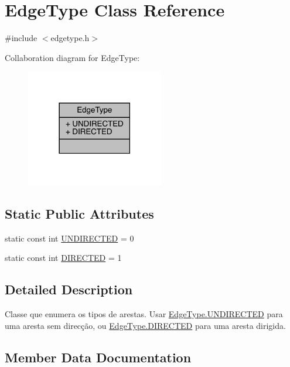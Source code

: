 \hypertarget{class_edge_type}{}\section{Edge\+Type Class Reference}
\label{class_edge_type}


{\ttfamily \#include $<$edgetype.\+h$>$}



Collaboration diagram for Edge\+Type\+:\nopagebreak
\begin{figure}[H]
\begin{center}
\leavevmode
\includegraphics[width=170pt]{class_edge_type__coll__graph}
\end{center}
\end{figure}
\subsection*{Static Public Attributes}
\begin{DoxyCompactItemize}
\item 
static const int \hyperlink{class_edge_type_a6533cc56d05c288a550b9980b66c9317}{U\+N\+D\+I\+R\+E\+C\+T\+ED} = 0
\item 
static const int \hyperlink{class_edge_type_a903017a534f2818c2d17145e4ae0321c}{D\+I\+R\+E\+C\+T\+ED} = 1
\end{DoxyCompactItemize}


\subsection{Detailed Description}
Classe que enumera os tipos de arestas. Usar \hyperlink{class_edge_type_a6533cc56d05c288a550b9980b66c9317}{Edge\+Type.\+U\+N\+D\+I\+R\+E\+C\+T\+ED} para uma aresta sem direcção, ou \hyperlink{class_edge_type_a903017a534f2818c2d17145e4ae0321c}{Edge\+Type.\+D\+I\+R\+E\+C\+T\+ED} para uma aresta dirigida. 

\subsection{Member Data Documentation}
\hypertarget{class_edge_type_a903017a534f2818c2d17145e4ae0321c}{}\label{class_edge_type_a903017a534f2818c2d17145e4ae0321c} 
